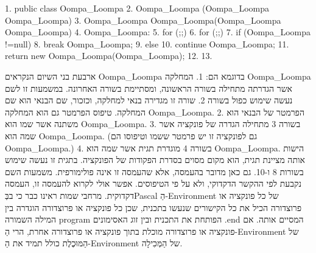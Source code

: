       \begin{JAVA}
1. public class Oompa_Loompa {
2. Oompa_Loompa (Oompa_Loompa Oompa_Loompa) { }
3. Oompa_Loompa Oompa_Loompa(Oompa_Loompa Oompa_Loompa) {
4. Oompa_Loompa:
5. for (;;)
6. for (;;)
7. if (Oompa_Loompa !=null)
8. break Oompa_Loompa;
9. else
10. continue Oompa_Loompa;
11. return new Oompa_Loompa(Oompa_Loompa);
12. }
13. }
\end{JAVA}

      ארבעת בני השיום הנקראים Oompa\_Loompa בדוגמא הם:
      1. המחלקה Oompa\_Loompa אשר הגדרתה מתחילה בשורה הראשונה, ומסתיימת בשורה האחרונה. במשמעות זו לשם נעשה שימוש כפול בשורה 2. שורה זו מגדירה בנאי למחלקה, וכזכור, שם הבנאי הוא שם המחלקה. טיפוס הפרמטר גם הוא המחלקה Oompa\_Loompa.
      2. הפרמטר של הבנאי הוא משתנה אשר שמו הוא Oompa\_Loompa.
      3. בשורה 3 מתחילה הגדרה של פונקציה אשר שמה הוא Oompa\_Loompa. (גם לפונקציה זו יש פרמטר ששמו וטיפוסו הם Oompa\_Loompa.)
      4. בשורה 4 מוגדרת תגית אשר שמה הוא Oompa\_Loompa. הישות אותה מציינת תגית, הוא מקום מסוים בסדרת הפקודות של הפונקציה. בתגית זו נעשה שימוש בשורות 8 ו-10.
      גם כאן מדובר בהעמסה, אלא שהעמסה זו אינה פולימורפית. משמעות השם נקבעת לפי ההקשר הדקדוקי, ולא על פי הטיפוסים. אפשר אולי לקרוא להעמסה זו, העמסה דקדוקית.
      מרחבי שמות
      ראינו כבר כי בבְּPascal הַ-Environment של כל פונקציה או פרוצדורה הכיל את כל הקישורים שנעשו בתכנית, שכן כל פונקציה או פרוצדורה הוגדרה בין המילה השמורה program הפותחת את התכנית ובין זוג האסימונים .end המסיים אותה. אם פונקציה או פרוצדורה מוכלת בתוך פונקציה או פרוצדורה אחרת, הרי הַ-Environment של הַמּוּכֶלֶת כולל תמיד את הַ-Environment של הַמְּכִילָה.

